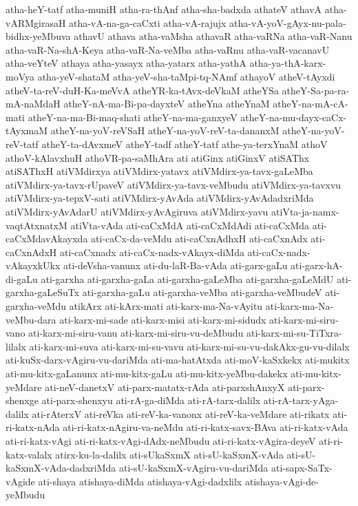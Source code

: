 {atha-heY-tatf
atha-muniH
atha-ra-thAnf
atha-sha-badxda
athateV
athavA
atha-vARMgirasaH
atha-vA-na-ga-caCxti
atha-vA-rajujx
atha-vA-yoV-gAyx-nu-pala-bidhx-yeMbuva
athavU
athava
atha-vaMsha
athavaR
atha-vaRNa
atha-vaR-Nanu
atha-vaR-Na-shA-Keya
atha-vaR-Na-veMba
atha-vaRnu
atha-vaR-vacanavU
atha-veYteV
athaya
atha-yasayx
atha-yatarx
atha-yathA
atha-ya-thA-karx-moVya
atha-yeV-shataM
atha-yeV-sha-taMpi-tq-NAmf
athayoV
atheV-tAyxdi
atheV-ta-reV-duH-Ka-meVvA
atheYR-ka-tAvx-deVkaM
atheYSa
atheY-Sa-pa-ra-mA-naMdaH
atheY-nA-ma-Bi-pa-dayxteV
atheYna
atheYnaM
atheY-na-mA-cA-mati
atheY-na-ma-Bi-maq-shati
atheY-na-ma-ganxyeV
atheY-na-mu-dayx-caCx-tAyxmaM
atheY-na-yoV-reVSaH
atheY-na-yoV-reV-ta-dananxM
atheY-na-yoV-reV-tatf
atheY-ta-dAvxmeV
atheY-tadf
atheY-tatf
athe-ya-terxYnaM
athoV
athoV-kAlavxhuH
athoVR-pa-saMhAra
ati
atiGinx
atiGinxV
atiSAThx
atiSAThxH
atiVMdirxya
atiVMdirx-yatavx
atiVMdirx-ya-tavx-gaLeMba
atiVMdirx-ya-tavx-rUpaveV
atiVMdirx-ya-tavx-veMbudu
atiVMdirx-ya-tavxvu
atiVMdirx-ya-tepxV-sati
atiVMdirx-yAvAda
atiVMdirx-yAvAdadxriMda
atiVMdirx-yAvAdarU
atiVMdirx-yAvAgiruva
atiVMdirx-yavu
atiVta-ja-namx-vaqtAtxnatxM
atiVta-vAda
ati-caCxMdA
ati-caCxMdAdi
ati-caCxMda
ati-caCxMdavAkayxda
ati-caCx-da-veMdu
ati-caCxnAdhxH
ati-caCxnAdx
ati-caCxnAdxH
ati-caCxnadx
ati-caCx-nadx-vAkayx-diMda
ati-caCx-nadx-vAkayxkUkx
ati-deVsha-vanunx
ati-du-laR-Ba-vAda
ati-garx-gaLu
ati-garx-hA-di-gaLu
ati-garxha
ati-garxha-gaLa
ati-garxha-gaLeMba
ati-garxha-gaLeMdU
ati-garxha-gaLeSuTx
ati-garxha-gaLu
ati-garxha-veMba
ati-garxha-veMbudeV
ati-garxha-veMdu
atikArx
ati-kArx-mati
ati-karx-ma-Na-vAyitu
ati-karx-ma-Na-veMbu-dara
ati-karx-mi-sade
ati-karx-misi
ati-karx-mi-sidudx
ati-karx-mi-siru-vano
ati-karx-mi-siru-vanu
ati-karx-mi-siru-vu-deMbudu
ati-karx-mi-su-TiTxra-lilalx
ati-karx-mi-suva
ati-karx-mi-su-vavu
ati-karx-mi-su-vu-dakAkx-gu-vu-dilalx
ati-kuSx-darx-vAgiru-vu-dariMda
ati-ma-hatAtxda
ati-moV-kaSxkekx
ati-mukitx
ati-mu-kitx-gaLanunx
ati-mu-kitx-gaLu
ati-mu-kitx-yeMbu-dakekx
ati-mu-kitx-yeMdare
ati-neV-danetxV
ati-parx-matatx-rAda
ati-parxshAnxyX
ati-parx-shenxge
ati-parx-shenxyu
ati-rA-ga-diMda
ati-rA-tarx-dalilx
ati-rA-tarx-yAga-dalilx
ati-rAterxV
ati-reVka
ati-reV-ka-vanonx
ati-reV-ka-veMdare
ati-rikatx
ati-ri-katx-nAda
ati-ri-katx-nAgiru-va-neMdu
ati-ri-katx-savx-BAva
ati-ri-katx-vAda
ati-ri-katx-vAgi
ati-ri-katx-vAgi-dAdx-neMbudu
ati-ri-katx-vAgira-deyeV
ati-ri-katx-valalx
atirx-ku-la-dalilx
ati-sUkaSxmX
ati-sU-kaSxmX-vAda
ati-sU-kaSxmX-vAda-dadxriMda
ati-sU-kaSxmX-vAgiru-vu-dariMda
ati-sapx-SaTx-vAgide
ati-shaya
atishaya-diMda
atishaya-vAgi-dadxlilx
atishaya-vAgi-de-yeMbudu
}
